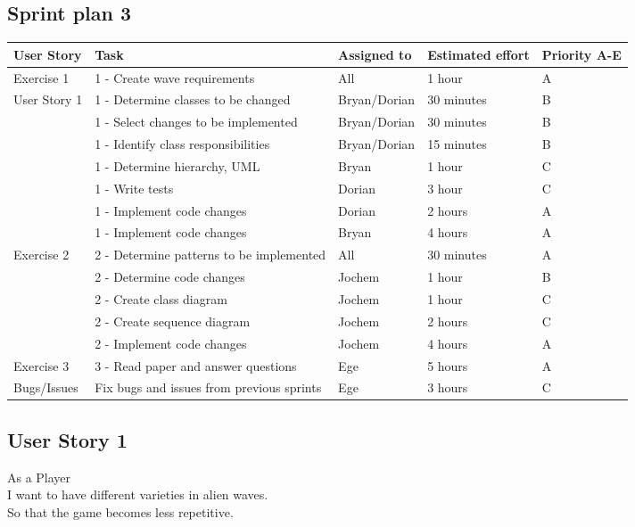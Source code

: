 \documentclass[10pt]{article}
\begin{document}
\begin{center}

\section*{Sprint plan 3}

    \hspace*{-3cm}\begin{tabular}{ | p{2cm} | p{9cm} | p{2.1cm} | p{2cm} | p{2cm} |}
    \hline
    User Story & Task & Assigned to & Estimated effort & Priority A-E \\ \hline
    Exercise 1 & 1 - Create wave requirements & All & 1 hour & A\\ 
    User Story 1 & 1 - Determine classes to be changed & Bryan/Dorian & 30 minutes & B\\ 
    & 1 - Select changes to be implemented & Bryan/Dorian & 30 minutes & B\\ 
    & 1 - Identify class responsibilities & Bryan/Dorian & 15 minutes & B\\ 
    & 1 - Determine hierarchy, UML & Bryan & 1 hour & C\\ 
    & 1 - Write tests & Dorian & 3 hour & C\\
    & 1 - Implement code changes & Dorian & 2 hours & A\\ 
    & 1 - Implement code changes & Bryan & 4  hours & A\\ \hline
    Exercise 2 & 2 - Determine patterns to be implemented & All & 30 minutes & A\\ 
    & 2 - Determine code changes & Jochem & 1 hour & B\\
    & 2 - Create class diagram & Jochem & 1 hour & C\\ 
    & 2 - Create sequence diagram & Jochem & 2 hours & C\\ 
    & 2 - Implement code changes & Jochem & 4 hours & A \\ \hline
    Exercise 3 & 3 - Read paper and answer questions & Ege & 5 hours & A\\ \hline
    Bugs/Issues & Fix bugs and issues from previous sprints & Ege & 3 hours & C\\ \hline
    \end{tabular}
    
\end{center}

\subsection*{User Story 1}
As a Player\\ 
\indent I want to have different varieties in alien waves.\\
So that the game becomes less repetitive. 
\end{document}
